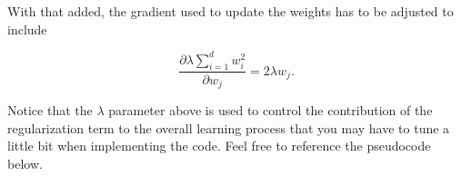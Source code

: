 \documentclass{article}
\begin{document}
\noindent With that added, the gradient used to update the weights has to be adjusted to include 

\begin{equation}
    \frac{\partial \lambda\sum_{i=1}^{d}w_i^2}{\partial w_j} = 2\lambda w_j.
    \label{eq:l2normgrad}
\end{equation}

\noindent Notice that the \(\lambda\) parameter above is used to control the contribution of the regularization term to the overall learning process that you may have to tune a little bit when implementing the code. Feel free to reference the pseudocode below.

\begin{algorithm}
\caption{Stochastic Gradient Descent with Regularization}\label{alg:sgd}
\begin{algorithmic}[1]

 
 
 
 
 





    

        

        \EndFor
        

\end{algorithmic}
\end{algorithm}
\end{document}

